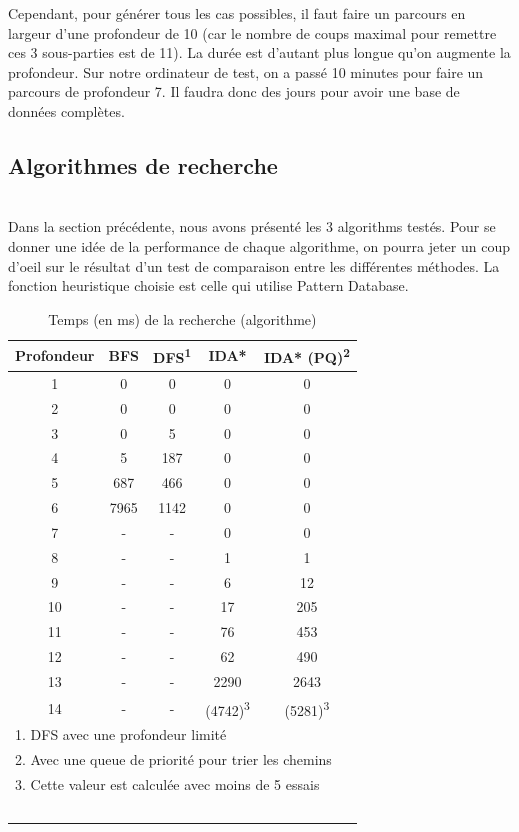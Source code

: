 \documentclass[fleqn,10pt,french]{SelfArx} %
\begin{document}
Cependant, pour générer tous les cas possibles, il faut faire un parcours en largeur d’une profondeur de 10 (car le nombre de coups maximal pour remettre ces 3 sous-parties est de 11). La durée est d’autant plus longue qu’on augmente la profondeur. Sur notre ordinateur de test, on a passé 10 minutes pour faire un parcours de profondeur 7. Il faudra donc des jours pour avoir une base de données complètes.

\subsection{Algorithmes de recherche}

~\\\indent
Dans la section précédente, nous avons présenté les 3 algorithms testés. Pour se donner une idée de la performance de chaque algorithme, on pourra jeter un coup d’oeil sur le résultat d’un test de comparaison entre les différentes méthodes. La fonction heuristique choisie est celle qui utilise Pattern Database.

\begin{table}[htbp]
\centering
\begin{tabular}{ccccc}
\hline
\rowcolor{blue!20} \rule{0pt}{12pt} \textbf{Profondeur} & \textbf{BFS} & \textbf{DFS}\textsuperscript{1} & \textbf{IDA*} &  \textbf{IDA* (PQ)\textsuperscript{2}}\\
\hline
1 & 0 & 0 & 0 & 0  \\
2 & 0 & 0 & 0 & 0 \\
3 & 0 & 5 & 0 & 0 \\
4 & 5 & 187 & 0 & 0 \\
5 & 687 & 466 & 0 & 0 \\
6 & 7965 & 1142 & 0 & 0  \\
7 & - & - & 0 & 0 \\
8 & - & - & 1 & 1 \\
9 & - & - & 6 & 12 \\
10 & - & - & 17 & 205 \\
11 & - & - & 76 & 453 \\
12 & - & - & 62 & 490 \\
13 & - & - & 2290 & 2643 \\
14 & - & - & (4742)\textsuperscript{3} & (5281)\textsuperscript{3} \\
\hline
\multicolumn{5}{l}{\small{1. DFS avec une profondeur limité}} \\
\multicolumn{5}{l}{\small{2. Avec une queue de priorité pour trier les chemins}} \\
\multicolumn{5}{l}{\small{3. Cette valeur est calculée avec moins de 5 essais}} \\
\hline
~\\
\end{tabular}
\caption{Temps (en ms) de la recherche (algorithme)}
\end{table}
\end{document}
